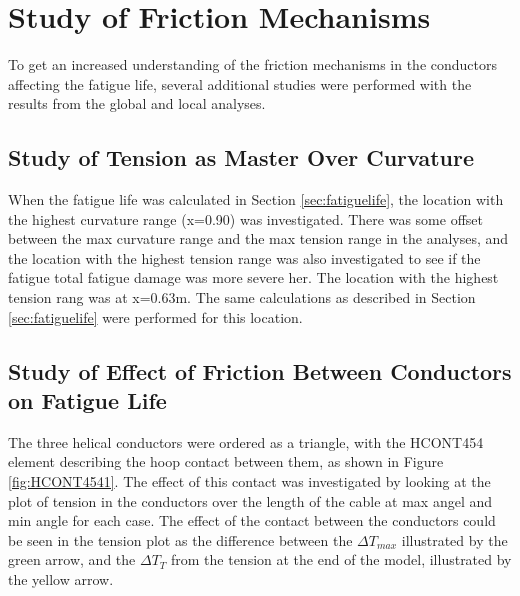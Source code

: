 \section{Study of Friction Mechanisms}
To get an increased understanding of the friction mechanisms in the conductors affecting the fatigue life, several additional studies were performed with the results from the global and local analyses.
\subsection{Study of Tension as Master Over Curvature}
When the fatigue life was calculated in Section \ref{sec:fatiguelife}, the location with the highest curvature range (x=0.90) was investigated. There was some offset between the max curvature range and the max tension range in the analyses, and  the location with the highest tension range was also investigated to see if the fatigue total fatigue damage was more severe her. The location with the highest tension rang was at x=0.63m. The same calculations as described in Section \ref{sec:fatiguelife} were performed for this location.  
\subsection{Study of Effect of Friction Between Conductors on Fatigue Life}
The three helical conductors were ordered as a triangle, with the HCONT454 element describing the hoop contact between them, as shown in Figure \ref{fig:HCONT4541}. The effect of this contact was investigated by looking at the plot of tension in the conductors over the length of the cable at max angel and min angle for each case. The effect of the contact between the conductors could be seen in the tension plot as the difference between the $\Delta T_{max}$ illustrated by the green arrow, and the $\Delta T_T$ from the tension at the end of the model, illustrated by the yellow arrow. 

